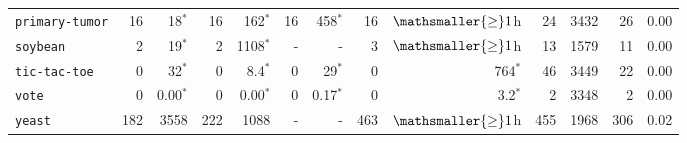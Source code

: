 \begin{tabular}{lrrrrrrrrrrrr}
\texttt{primary-tumor} & 16 & 18$^*$ & 16 & 162$^*$ & 16 & 458$^*$ & 16 & $\mathsmaller{\geq}1$h & 24 & 3432 & 26 & 0.00\\
\texttt{soybean} & 2 & 19$^*$ & 2 & 1108$^*$ & - & - & 3 & $\mathsmaller{\geq}1$h & 13 & 1579 & 11 & 0.00\\
\texttt{tic-tac-toe} & 0 & 32$^*$ & 0 & 8.4$^*$ & 0 & 29$^*$ & 0 & 764$^*$ & 46 & 3449 & 22 & 0.00\\
\texttt{vote} & 0 & 0.00$^*$ & 0 & 0.00$^*$ & 0 & 0.17$^*$ & 0 & 3.2$^*$ & 2 & 3348 & 2 & 0.00\\
\texttt{yeast} & 182 & 3558 & 222 & 1088 & - & - & 463 & $\mathsmaller{\geq}1$h & 455 & 1968 & 306 & 0.02\\
\bottomrule
\end{tabular}
